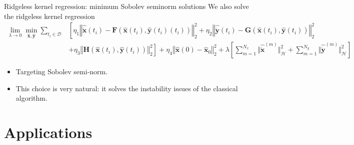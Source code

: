 \documentclass[aspectratio=169,10pt]{beamer}
\begin{document}
\begin{frame}{Ridgeless kernel regression: minimum Sobolev seminorm solutions}
We also solve the ridgeless kernel regression 
\begin{align*}
	\lim_{\lambda\rightarrow 0} \min_{\hat{\mathbf{x}}, \hat{\mathbf{y}}} \sum_{t_i \in \mathcal{D}} &\left[\eta_1 \left\Vert \hat{\dot{\mathbf{x}}}(t_i) 
	- \mathbf{F}(\hat{\mathbf{x}}(t_i), \hat{\mathbf{y}}(t_i)(t_i)) \right\Vert_2^2 + \eta_2 \left\Vert \hat{\dot{\mathbf{y}}}(t_i) -  \mathbf{G}(\hat{\mathbf{x}}(t_i), \hat{\mathbf{y}}(t_i)) \right\Vert_2^2\right.\nonumber\\
	&\left.+ \eta_3 \left\Vert \mathbf{H}(\hat{\mathbf{x}}(t_i), \hat{\mathbf{y}}(t_i)) \right\Vert_2^2 \right] + \eta_4 \left\Vert \hat{\mathbf{x}}(0) - \hat{\mathbf{x}}_0 \right\Vert_2^2 + \lambda \left[\sum_{m=1}^{N_x}\Vert \hat{\dot{\mathbf{x}}}^{(m)}\Vert^2_{\mathcal{H}}+ \sum_{m=1}^{N_y}\Vert \hat{\dot{\mathbf{y}}}^{(m)}\Vert^2_{\mathcal{H}}\right]
\end{align*}
\begin{itemize}
	\item Targeting Sobolev semi-norm.
	\vspace{0.1in}
	\item This choice is very natural: it solves the instability issues of the classical algorithm.
\end{itemize} 
\end{frame}

\section{Applications}
\end{document}
